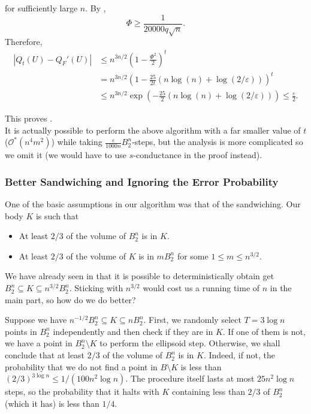 for sufficiently large $n$. By ,
\[ \Phi \geq \frac{1}{20000q\sqrt{n}}. \]
Therefore,
\begin{align*}
	|Q_t(U) - Q_F'(U)| &\leq n^{3n/2}\left(1-\frac{\Phi^2}{2}\right)^t \\
		&= n^{3n/2} \left(1 - \frac{25}{2t} \left(n\log(n) + \log(2/\varepsilon)\right)\right)^t \\
		&\leq n^{3n/2} \exp\left(-\frac{25}{2}\left(n\log(n) + \log(2/\varepsilon)\right)\right) \leq \frac{\varepsilon}{2}.
\end{align*}

This proves .\\
It is actually possible to perform the above algorithm with a far smaller value of $t$ ($\mathcal{O}^*(n^4m^2)$) while taking $\frac{\varepsilon}{1000n}B_2^n$-steps, but the analysis is more complicated so we omit it (we would have to use $s$-conductance in the proof instead). 

\subsubsection{Better Sandwiching and Ignoring the Error Probability}
\label{pro sandwiching}

One of the basic assumptions in our algorithm was that of the sandwiching. Our body $K$ is such that
\begin{itemize}
	\item At least $2/3$ of the volume of $B_2^n$ is in $K$.
	\item At least $2/3$ of the volume of $K$ is in $mB_2^n$ for some $1\leq m\leq n^{3/2}$.
\end{itemize}

We have already seen in  that it is possible to deterministically obtain get $B_2^n\subseteq K\subseteq n^{3/2}B_2^n$.
Sticking with $n^{3/2}$ would cost us a running time of $n$ in the main part, so how do we do better?

Suppose we have $n^{-1/2}B_2^n\subseteq K\subseteq nB_2^n$. First, we randomly select $T=3\log n$ points in $B_2^n$ independently and then check if they are in $K$. If one of them is not, we have a point in $B_2^n\setminus K$ to perform the ellipsoid step. Otherwise, we shall conclude that at least $2/3$ of the volume of $B_2^n$ is in $K$. Indeed, if not, the probability that we do not find a point in $B\setminus K$ is less than $(2/3)^{3\log n} \leq 1/(100n^2\log n)$. The procedure itself lasts at most $25n^2\log n$ steps, so the probability that it halts with $K$ containing less than $2/3$ of $B_2^n$ (which it has) is less than $1/4$.

